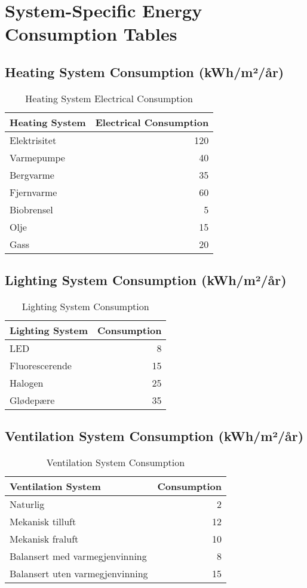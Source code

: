\documentclass[12pt,a4paper]{article}
\begin{document}
\section{System-Specific Energy Consumption Tables}

\subsection{Heating System Consumption (kWh/m²/år)}

\begin{table}[H]
\centering
\begin{tabular}{|l|r|}
\hline
\textbf{Heating System} & \textbf{Electrical Consumption} \\
\hline
Elektrisitet & 120 \\
Varmepumpe & 40 \\
Bergvarme & 35 \\
Fjernvarme & 60 \\
Biobrensel & 5 \\
Olje & 15 \\
Gass & 20 \\
\hline
\end{tabular}
\caption{Heating System Electrical Consumption}
\end{table}

\subsection{Lighting System Consumption (kWh/m²/år)}

\begin{table}[H]
\centering
\begin{tabular}{|l|r|}
\hline
\textbf{Lighting System} & \textbf{Consumption} \\
\hline
LED & 8 \\
Fluorescerende & 15 \\
Halogen & 25 \\
Glødepære & 35 \\
\hline
\end{tabular}
\caption{Lighting System Consumption}
\end{table}

\subsection{Ventilation System Consumption (kWh/m²/år)}

\begin{table}[H]
\centering
\begin{tabular}{|l|r|}
\hline
\textbf{Ventilation System} & \textbf{Consumption} \\
\hline
Naturlig & 2 \\
Mekanisk tilluft & 12 \\
Mekanisk fraluft & 10 \\
Balansert med varmegjenvinning & 8 \\
Balansert uten varmegjenvinning & 15 \\
\hline
\end{tabular}
\caption{Ventilation System Consumption}
\end{table}
\end{document}
